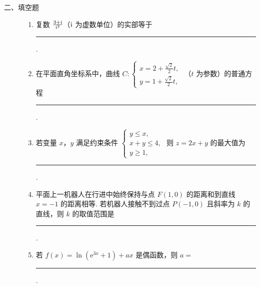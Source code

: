 \begin{description}

    \item[二、填空题]

    \begin{enumerate}[leftmargin=5pt]

      \addtocounter{enumi}{+10}

        \item 复数 \(\frac{3 + \mathrm{i}}{\mathrm{i}^2}\)（\(\mathrm{i}\) 为虚数单位）的实部等于\rule[-0.3ex]{3em}{0.4pt}.

        \item 在平面直角坐标系中，曲线 \(C: \begin{cases}
x = 2 + \frac{\sqrt{2}}{2} t,\\
y = 1 + \frac{\sqrt{2}}{2} t,
\end{cases}\) （\(t\) 为参数）的普通方程\rule[-0.3ex]{3em}{0.4pt}.

        \item 若变量 \(x\)，\(y\) 满足约束条件 \(\begin{cases}
y \leqslant x,\\
x + y \leqslant 4,\\
y \geqslant 1,
\end{cases}\) 则 \(z = 2x + y\) 的最大值为\rule[-0.3ex]{3em}{0.4pt}.

        \item 平面上一机器人在行进中始终保持与点 \(F(1,0)\) 的距离和到直线 \(x = -1\) 的距离相等. 若机器人接触不到过点 \(P(-1,0)\) 且斜率为 \(k\) 的直线，则 \(k\) 的取值范围是\rule[-0.3ex]{3em}{0.4pt}.

        \item 若 \( f(x) = \ln\left({\mathrm{e}}^{3x} + 1\right) + ax \) 是偶函数，则 \( a = \)\rule[-0.3ex]{3em}{0.4pt}.

    \end{enumerate}

\end{description}

